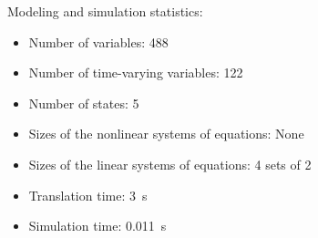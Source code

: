 \begin{contextbox}
  Modeling and simulation statistics:
  \begin{itemize}
    \item Number of variables: 488
    \item Number of time-varying variables: 122
    \item Number of states: 5
    \item Sizes of the nonlinear systems of equations: None
    \item Sizes of the linear systems of equations: 4 sets of 2
    \item Translation time: \SI{3}{s}
    \item Simulation time: \SI{0.011}{s}
  \end{itemize}
\end{contextbox}